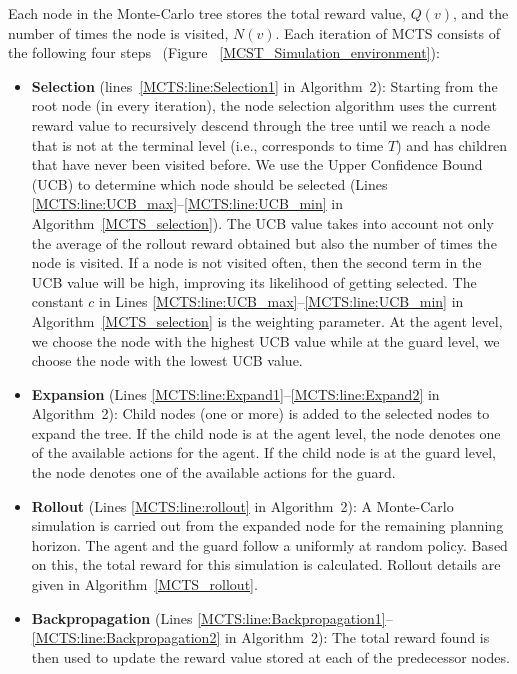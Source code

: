 \documentclass[10 pt, conference]{ieeeconf}
\newcommand{\PT}[1]{{\footnotesize\color{blue}[{\bf PT:} \textsf{#1}]}} %
\begin{document}
Each node in the Monte-Carlo tree stores the total reward value, $Q(v)$, and the number of times the node is visited, $N(v)$. Each iteration of MCTS consists of the following four steps~\cite{chaslot2008monte} (Figure ~\ref{MCST_Simulation_environment}):
\begin{itemize}
\item \textbf{Selection} (lines~\ref{MCTS:line:Selection1} in Algorithm~2): Starting from the root node (in every iteration), the node selection algorithm uses the current reward value to recursively descend through the tree until we reach a node that is not at the terminal level (i.e., corresponds to time $T$) and has children that have never been visited before. We use the Upper Confidence Bound (UCB) to determine which node should be selected (Lines \ref{MCTS:line:UCB_max}--\ref{MCTS:line:UCB_min} in  Algorithm~\ref{MCTS_selection}). The UCB value takes into account not only the average of the rollout reward obtained but also the number of times the node is visited. If a node is not visited often, then the second term in the UCB value will be high, improving its likelihood of getting selected. The constant $c$ in Lines \ref{MCTS:line:UCB_max}--\ref{MCTS:line:UCB_min} in  Algorithm~\ref{MCTS_selection} is the weighting parameter. At the agent level, we choose the node with the highest UCB value while at the guard level, we choose the node with the lowest UCB value.
\item \textbf{Expansion} (Lines \ref{MCTS:line:Expand1}--\ref{MCTS:line:Expand2} in Algorithm~2): Child nodes (one or more) is added to the selected nodes to expand the tree. If the child node is at the agent level, the node denotes one of the available actions for the agent. If the child node is at the guard level, the node denotes one of the available actions for the guard.
\item \textbf{Rollout} (Lines \ref{MCTS:line:rollout} in Algorithm~2): A Monte-Carlo simulation is carried out from the expanded node for the remaining planning horizon. The agent and the guard follow a uniformly at random policy. Based on this, the total reward for this simulation is calculated. Rollout details are given in Algorithm~\ref{MCTS_rollout}.
\item \textbf{Backpropagation} (Lines \ref{MCTS:line:Backpropagation1}--\ref{MCTS:line:Backpropagation2} in Algorithm~2): The total reward found is then used to update the reward value stored at each of the predecessor nodes.
\end{itemize}
\end{document}
